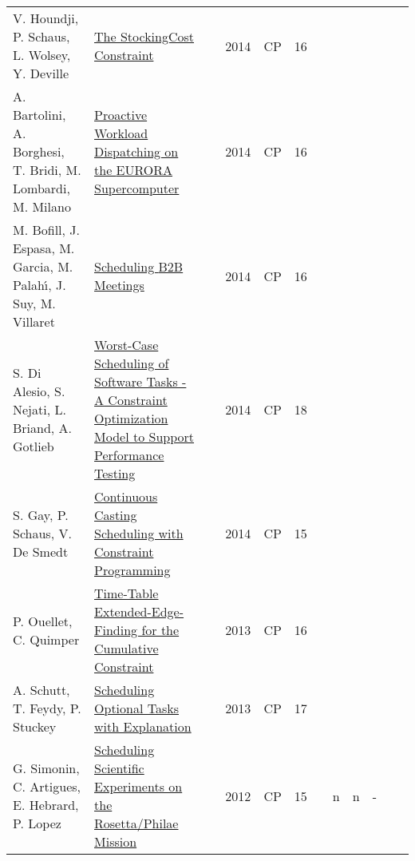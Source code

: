 \documentclass[a4paper]{article}
\newcommand{\su}[1]{\Shortunderstack[l]{#1}}
\begin{document}
{\begin{longtable}{p{3cm}p{6cm}rrcrlcccp{1.5cm}l}
V. Houndji, P. Schaus, L. Wolsey, Y. Deville& \href{papers/HoundjiSWD14.pdf}{The StockingCost Constraint} & \cite{HoundjiSWD14} & 2014 & CP & 16 & & & & & & \\
A. Bartolini, A. Borghesi, T. Bridi, M. Lombardi, M. Milano& \href{papers/BartoliniBBLM14.pdf}{Proactive Workload Dispatching on the {EURORA} Supercomputer} & \cite{BartoliniBBLM14} & 2014 & CP & 16 & & & & & & \\
M. Bofill, J. Espasa, M. Garcia, M. Palah{\'{\i}}, J. Suy, M. Villaret& \href{papers/BofillEGPSV14.pdf}{Scheduling {B2B} Meetings} & \cite{BofillEGPSV14} & 2014 & CP & 16 & & & & & & \\
S. {Di Alesio}, S. Nejati, L. Briand, A. Gotlieb& \href{papers/AlesioNBG14.pdf}{Worst-Case Scheduling of Software Tasks - {A} Constraint Optimization Model to Support Performance Testing} & \cite{AlesioNBG14} & 2014 & CP & 18 & & & & & & \\
S. Gay, P. Schaus, V. De Smedt& \href{papers/GaySS14.pdf}{Continuous Casting Scheduling with Constraint Programming} & \cite{GaySS14} & 2014 & CP & 15 & & & & & & \\
P. Ouellet, C. Quimper& \href{papers/OuelletQ13.pdf}{Time-Table Extended-Edge-Finding for the Cumulative Constraint} & \cite{OuelletQ13} & 2013 & CP & 16 & & & & & & \\
A. Schutt, T. Feydy, P. Stuckey& \href{papers/SchuttFS13.pdf}{Scheduling Optional Tasks with Explanation} & \cite{SchuttFS13} & 2013 & CP & 17 & & & & & & \\
G. Simonin, C. Artigues, E. Hebrard, P. Lopez& \href{papers/SimoninAHL12.pdf}{Scheduling Scientific Experiments on the Rosetta/Philae Mission} & \cite{SimoninAHL12} & 2012 & CP & 15 & \su{MOST {Ilog Scheduler}} & n & n & -& & \su{cumulative dataTransfer}\\


\end{longtable}}
\end{document}
